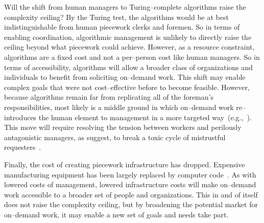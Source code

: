 \documentclass[trackingWork]{subfiles}
\begin{document}
Will the shift from human managers to Turing--complete algorithms raise the complexity ceiling? 
By the Turing test, the algorithms would be at best indistinguishable from human piecework clerks and foremen.
So in terms of enabling coordination, algorithmic management is unlikely to directly raise the ceiling beyond what piecework could achieve.
However, as a resource constraint, algorithms are a fixed cost and not a per--person cost like human managers.
So in terms of accessibility, algorithms will allow a broader class of organizations and individuals to benefit from soliciting on--demand work.
This shift may enable complex goals that were not cost--effective before to become feasible.
However, because algorithms remain far from replicating all of the foreman's responsibilities,
most likely is a middle ground in which on--demand work re--introduces
the human element to management in a more targeted way~(e.g.,~\cite{haas2015argonaut,kulkarni2012mobileworks,crowdguilds}).
This move will require resolving the tension between workers and perilously antagonistic managers, as \citeauthor{10.2307/2118435} suggest, to break a toxic cycle of mistrustful requesters~\cite{MaliciousCrowdworkersGadiraju}.


Finally, the cost of creating piecework infrastructure has dropped. 
Expensive manufacturing equipment has been largely replaced by computer code~\cite{lessig2006code}.
As with lowered costs of management, lowered infrastructure costs will make on--demand work accessible to a broader set of people and organizations.
This in and of itself does not raise the complexity ceiling, but by broadening the potential market for on--demand work, it may enable a new set of goals and needs take part.

\end{document}
